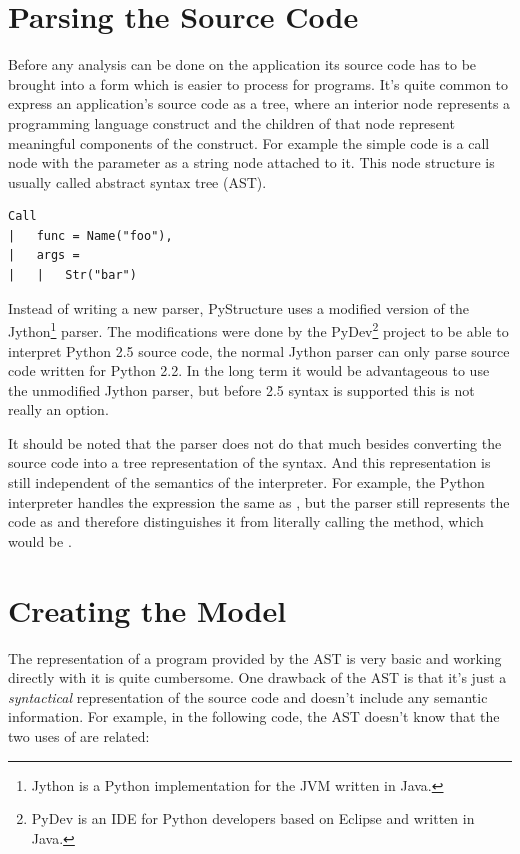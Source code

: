 \documentclass[12pt,halfparskip,DIV11,BCOR10mm]{scrreprt}
\begin{document}
\section{Parsing the Source Code}

Before any analysis can be done on the application its source code has to be brought into a form which is easier to process for programs. It's quite common to express an application's source code as a tree, where an interior node represents a programming language construct and the children of that node represent meaningful components of the construct. For example the simple code  is a call node with the parameter as a string node attached to it. This node structure is usually called abstract syntax tree (AST).

\begin{lstlisting}
Call
|   func = Name("foo"),
|   args = 
|   |   Str("bar")
\end{lstlisting}

Instead of writing a new parser, PyStructure uses a modified version of the Jython\footnote{Jython is a Python implementation for the JVM written in Java.} parser. The modifications were done by the PyDev\footnote{PyDev is an IDE for Python developers based on Eclipse and written in Java.} project to be able to interpret Python 2.5 source code, the normal Jython parser can only parse source code written for Python 2.2. In the long term it would be advantageous to use the unmodified Jython parser, but before 2.5 syntax is supported this is not really an option.

It should be noted that the parser does not do that much besides converting the source code into a tree representation of the syntax. And this representation is still independent of the semantics of the interpreter. For example, the Python interpreter handles the expression  the same as , but the parser still represents the code as  and therefore distinguishes it from literally calling the  method, which would be .


\section{Creating the Model}


The representation of a program provided by the AST is very basic and working directly with it is quite cumbersome. 
One drawback of the AST is that it's just a \emph{syntactical} representation of the source code and doesn't include any semantic information. For example, in the following code, the AST doesn't know that the two uses of  are related:
\end{document}
